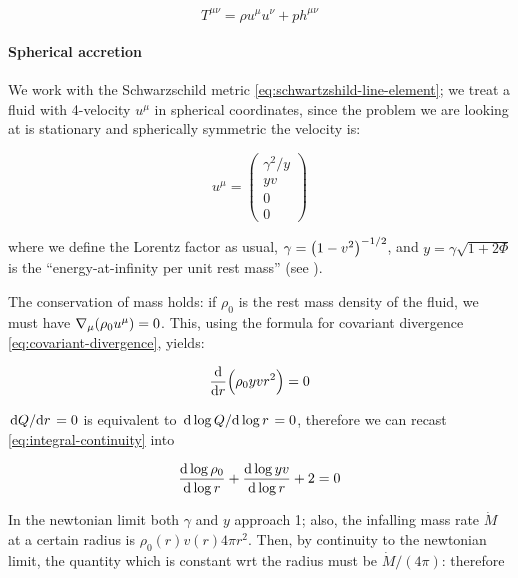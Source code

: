 \documentclass[main.tex]{subfiles}
\begin{document}
\begin{equation}
    T^{\mu\nu} = \rho u^\mu u^\nu + p h^{\mu\nu}
\end{equation}

\paragraph{Spherical accretion}

We work with the Schwarzschild metric \eqref{eq:schwartzshild-line-element}; we treat a fluid with 4-velocity $u^\mu$ in spherical coordinates, since the problem we are looking at is stationary and spherically symmetric the velocity is:

\begin{equation}
    u^\mu = \begin{pmatrix}
        \gamma^2 / y\\
        yv\\
        0\\
        0
    \end{pmatrix}
\end{equation}

where we define the Lorentz factor as usual, $\gamma = \qty(1-v^2)^{-1/2}$, and $y=\gamma \sqrt{1+2\Phi}$ is the ``energy-at-infinity per unit rest mass'' (see \cite[equation 3]{thorne1981-2}).

The conservation of mass holds: if $\rho_0$ is the rest mass density of the fluid, we must have $\nabla_\mu \qty(\rho_0 u^\mu) =0$. This, using the formula for covariant divergence \eqref{eq:covariant-divergence}, yields:

\begin{equation} \label{eq:integral-continuity}
    \dv{}{r} \qty(\rho_0 yvr^2) = 0
\end{equation}

\(\dv*{Q}{r} = 0\) is equivalent to \(\dv*{\log Q }{\log r} = 0 \), therefore we can recast \eqref{eq:integral-continuity} into

\begin{equation} \label{eq:differential-continuity}
  \dv{\log \rho_0}{\log r} +
  \dv{\log yv}{\log r} + 2 = 0
\end{equation}

In the newtonian limit both $\gamma$ and $y$ approach 1; also, the infalling mass rate $\Dot{M}$ at a certain radius is $\rho_0 (r) v(r) 4\pi r^2$. Then, by continuity to the newtonian limit, the quantity which is constant wrt the radius must be $\Dot{M} / (4\pi)$: therefore
\end{document}
